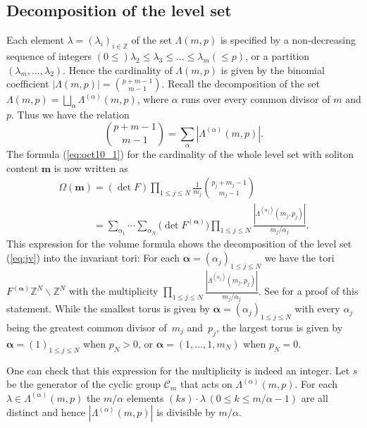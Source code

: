 \documentclass[pdftex]{sigma}
\newcommand{\Z}{{\mathbb Z}}
\newcommand\boa{\boldsymbol{\alpha}}
\newcommand{\m}{{\boldsymbol m}}
\begin{document}
\subsection{Decomposition of the level set}\label{subsec:5_2}
Each element $\lambda = (\lambda_i)_{i \in \Z}$ of the set $\Lambda (m,p)$
is specif\/ied by
a non-decreasing sequence of integers $(0 \leq) \lambda_2 \leq \lambda_3 \leq \dots \leq \lambda_m (\leq p)$,
or a partition $(\lambda_m, \ldots, \lambda_2)$.
Hence the cardinality of $\Lambda (m,p)$ is given by the binomial coef\/f\/icient
\begin{math}
|\Lambda (m,p)| = { p+m-1 \choose m-1 }.
\end{math}
Recall the decomposition of the set $\Lambda (m,p) = \bigsqcup_{\alpha} \Lambda^{(\alpha)} (m,p)$,
where $\alpha$ runs over every common divisor of $m$ and $p$.
Thus we have the relation
\begin{equation*}
{ p+m-1 \choose m-1 } = \sum_\alpha |\Lambda^{(\alpha)} (m,p)|.
\end{equation*}
The formula (\ref{eq:oct10_1}) for the cardinality of
the whole level set with soliton content $\m$ is now written as
\begin{gather}
\Omega(\m) =
(\det F)\prod_{1 \leq j \leq N} \frac{1}{m_j}
\binom{p_j + m_j - 1}{m_j - 1} \nonumber\\
\phantom{\Omega(\m)}{}
=
\sum_{\alpha_1} \cdots \sum_{\alpha_N} \big(\det F^{(\boa)}\big)
\prod_{1 \leq j \leq N} \frac{|\Lambda^{(\alpha_j)} (m_j,p_j)|}{m_j/\alpha_j}.
\label{eq:oct24_1}
\end{gather}
This expression for the volume formula shows the decomposition of the level set (\ref{eq:jv}) into the invariant tori:
For each $\boa = (\alpha_j)_{1 \leq j \leq N}$
we have the tori $F^{(\boa)} \Z^N \backslash \Z^N$ with the multiplicity
$\prod_{1 \leq j \leq N} \frac{|\Lambda^{(\alpha_j)} (m_j,p_j)|}{m_j/\alpha_j}$.
See \cite[Lemmas 3.1 and 3.2]{KT} for a proof of this statement.
While  the smallest torus is given by $\boa = (\alpha_j)_{1 \leq j \leq N}$ with every $\alpha_j$ being the greatest common divisor
of~$m_j$ and~$p_j$,
the largest torus is given by  $\boa = (1)_{1 \leq j \leq N}$ when $p_N > 0$, or $\boa = (1,\ldots,1,m_N)$ when $p_N =0$.


One can check that this expression for the
multiplicity is indeed an integer.
Let $s$ be the generator of the cyclic group ${\mathcal C}_m$ that acts on $\Lambda^{(\alpha)} (m,p)$.
For each $\lambda \in \Lambda^{(\alpha)} (m,p)$ the $m/\alpha$ elements $(k s) \cdot \lambda \, (0 \leq k \leq m/\alpha-1)$ are all distinct
and hence $|\Lambda^{(\alpha)} (m,p)|$ is divisible by $m/\alpha$.
\end{document}

